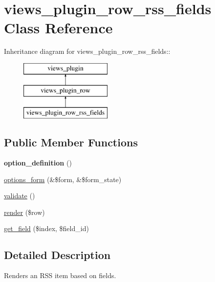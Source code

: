 \hypertarget{classviews__plugin__row__rss__fields}{
\section{views\_\-plugin\_\-row\_\-rss\_\-fields Class Reference}
\label{classviews__plugin__row__rss__fields}
}
Inheritance diagram for views\_\-plugin\_\-row\_\-rss\_\-fields::\begin{figure}[H]
\begin{center}
\leavevmode
\includegraphics[height=3cm]{classviews__plugin__row__rss__fields}
\end{center}
\end{figure}
\subsection*{Public Member Functions}
\begin{DoxyCompactItemize}
\item 
\hypertarget{classviews__plugin__row__rss__fields_aa8714310cab3c0fdbbcedc7590ed697f}{
{\bfseries option\_\-definition} ()}
\label{classviews__plugin__row__rss__fields_aa8714310cab3c0fdbbcedc7590ed697f}

\item 
\hyperlink{classviews__plugin__row__rss__fields_ab1747e15303777895d87d7cc8f37a788}{options\_\-form} (\&\$form, \&\$form\_\-state)
\item 
\hyperlink{classviews__plugin__row__rss__fields_ac4f5e75bc5a2277ed9041c18a3f2926d}{validate} ()
\item 
\hyperlink{classviews__plugin__row__rss__fields_a5ee883780c5e3aa5469969022fdd9186}{render} (\$row)
\item 
\hyperlink{classviews__plugin__row__rss__fields_a5ff87a83e78198b5efc6f13766750595}{get\_\-field} (\$index, \$field\_\-id)
\end{DoxyCompactItemize}


\subsection{Detailed Description}
Renders an RSS item based on fields. 

